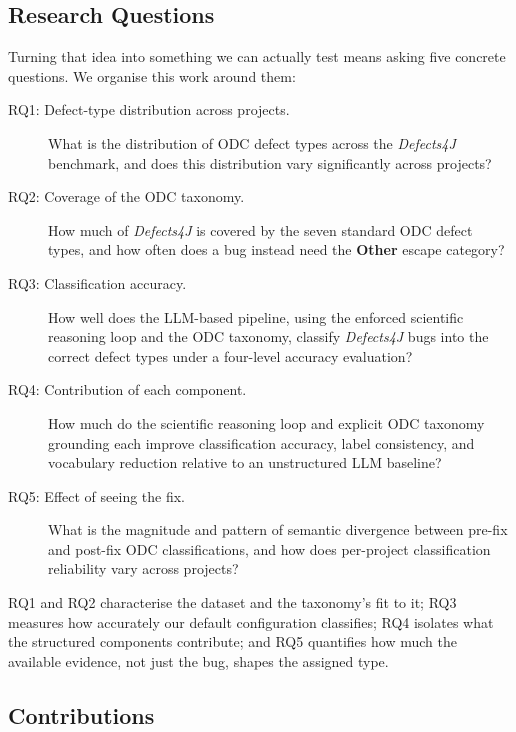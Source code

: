 \subsection{Research Questions}
\label{sec:rqs}

Turning that idea into something we can actually test means asking five
concrete questions. We organise this work around them:

\begin{description}
  \item[RQ1: Defect-type distribution across projects.] What is the
        distribution of ODC defect types across the \textit{Defects4J} benchmark,
        and does this distribution vary significantly across projects?
  \item[RQ2: Coverage of the ODC taxonomy.] How much of \textit{Defects4J} is
        covered by the seven standard ODC defect types, and how often does a
        bug instead need the \textbf{Other} escape category?
  \item[RQ3: Classification accuracy.] How well does the LLM-based pipeline,
        using the enforced scientific reasoning loop and the ODC taxonomy,
        classify \textit{Defects4J} bugs into the correct defect types under a
        four-level accuracy evaluation?
  \item[RQ4: Contribution of each component.] How much do the scientific
        reasoning loop and explicit ODC taxonomy grounding each improve
        classification accuracy, label consistency, and vocabulary reduction
        relative to an unstructured LLM baseline?
  \item[RQ5: Effect of seeing the fix.] What is the magnitude and pattern of
        semantic divergence between pre-fix and post-fix ODC classifications, and
        how does per-project classification reliability vary across projects?
\end{description}

RQ1 and RQ2 characterise the dataset and the taxonomy's fit to it; RQ3 measures
how accurately our default configuration classifies; RQ4 isolates what the
structured components contribute; and RQ5 quantifies how much the available
evidence, not just the bug, shapes the assigned type.

\subsection{Contributions}
\label{sec:contributions}

